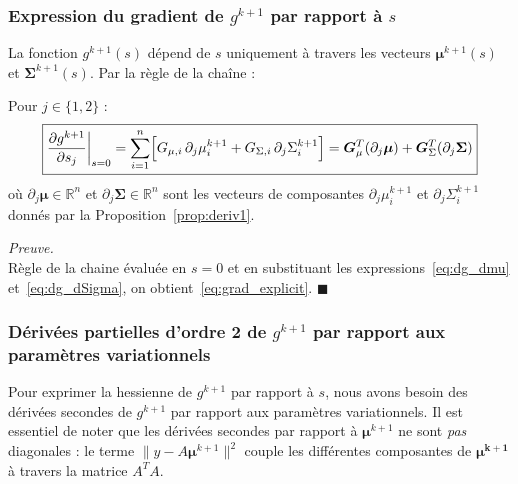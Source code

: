\documentclass[12pt]{article}
\renewcommand{\qedsymbol}{$\blacksquare$}
\renewenvironment{proof}[1][\proofname]{%
  \par\medskip\noindent
  \textit{\color{proofgray}#1.}\enspace\ignorespaces
}{\hfill\qedsymbol\par\medskip}
\renewcommand{\proofname}{Preuve}
\begin{document}
\subsubsection*{Expression du gradient de $g^{k+1}$ par rapport à $s$}

La fonction $g^{k+1}(s)$ dépend de $s$ uniquement à travers les vecteurs $\boldsymbol{\mu}^{k+1}(s)$ et $\boldsymbol{\Sigma}^{k+1}(s)$. Par la règle de la chaîne :

\begin{propositionbox}[Gradient de $g^{k+1}$]
\label{prop:grad_explicit}
Pour $j \in \{1,2\}$ :
\begin{equation}
\boxed{
\frac{\partial g^{k+1}}{\partial s_j}\bigg|_{s=0} = \sum_{i=1}^n \Bigl[ G_{\mu,i}\,\partial_j\mu_i^{k+1} + G_{\Sigma,i}\,\partial_j\Sigma_i^{k+1} \Bigr] = \boldsymbol{G}_\mu^T(\partial_j\boldsymbol{\mu}) + \boldsymbol{G}_\Sigma^T(\partial_j\boldsymbol{\Sigma})
}
\label{eq:grad_explicit}
\end{equation}
où $\partial_j\boldsymbol{\mu} \in \mathbb{R}^n$ et $\partial_j\boldsymbol{\Sigma} \in \mathbb{R}^n$ sont les vecteurs de composantes $\partial_j\mu_i^{k+1}$ et $\partial_j\Sigma_i^{k+1}$ donnés par la Proposition~\ref{prop:deriv1}.
\end{propositionbox}

\begin{proof}\\
Règle de la chaine évaluée en $s=0$ et en substituant les expressions~\eqref{eq:dg_dmu} et~\eqref{eq:dg_dSigma}, on obtient~\eqref{eq:grad_explicit}.
\end{proof}















\subsubsection*{Dérivées partielles d'ordre 2 de $g^{k+1}$ par rapport aux paramètres variationnels}

Pour exprimer la hessienne de $g^{k+1}$ par rapport à $s$, nous avons besoin des dérivées secondes de $g^{k+1}$ par rapport aux paramètres variationnels. Il est essentiel de noter que les dérivées secondes par rapport à $\boldsymbol{\mu}^{k+1}$ ne sont \emph{pas} diagonales : le terme $\|y - A\boldsymbol{\mu}^{k+1}\|^2$ couple les différentes composantes de $\boldsymbol{\mu^{k+1}}$ à travers la matrice $A^TA$.
\end{document}
